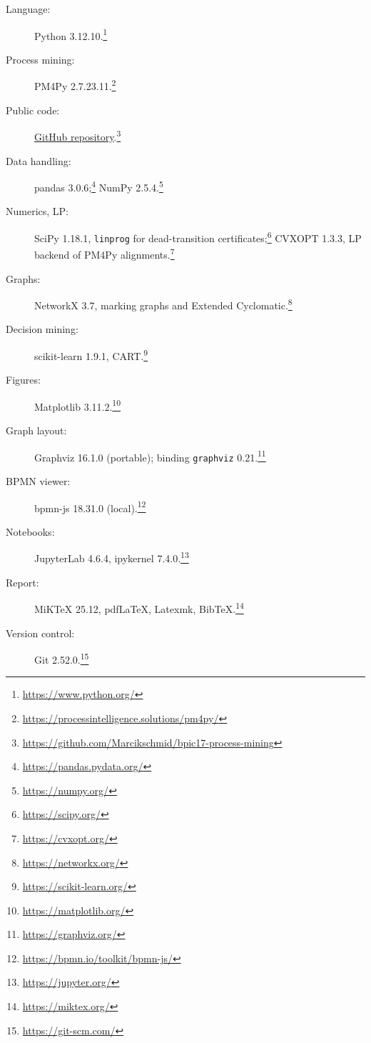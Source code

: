 \begin{description}
  \item[Language:] Python 3.12.10.\footnote{\url{https://www.python.org/}}
  \item[Process mining:] PM4Py 2.7.23.11.\footnote{\url{https://processintelligence.solutions/pm4py/}}
  \item[Public code:] \href{https://github.com/Marcikschmid/bpic17-process-mining}{GitHub repository}.\footnote{\url{https://github.com/Marcikschmid/bpic17-process-mining}}
  \item[Data handling:] pandas 3.0.6;\footnote{\url{https://pandas.pydata.org/}} NumPy 2.5.4.\footnote{\url{https://numpy.org/}}
  \item[Numerics, LP:] SciPy 1.18.1, \texttt{linprog} for dead-transition certificates;\footnote{\url{https://scipy.org/}} CVXOPT 1.3.3, LP backend of PM4Py alignments.\footnote{\url{https://cvxopt.org/}}
  \item[Graphs:] NetworkX 3.7, marking graphs and Extended Cyclomatic.\footnote{\url{https://networkx.org/}}
  \item[Decision mining:] scikit-learn 1.9.1, CART.\footnote{\url{https://scikit-learn.org/}}
  \item[Figures:] Matplotlib 3.11.2.\footnote{\url{https://matplotlib.org/}}
  \item[Graph layout:] Graphviz 16.1.0 (portable); binding \texttt{graphviz} 0.21.\footnote{\url{https://graphviz.org/}}
  \item[BPMN viewer:] bpmn-js 18.31.0 (local).\footnote{\url{https://bpmn.io/toolkit/bpmn-js/}}
  \item[Notebooks:] JupyterLab 4.6.4, ipykernel 7.4.0.\footnote{\url{https://jupyter.org/}}
  \item[Report:] MiKTeX 25.12, pdfLaTeX, Latexmk, BibTeX.\footnote{\url{https://miktex.org/}}
  \item[Version control:] Git 2.52.0.\footnote{\url{https://git-scm.com/}}
\end{description}
